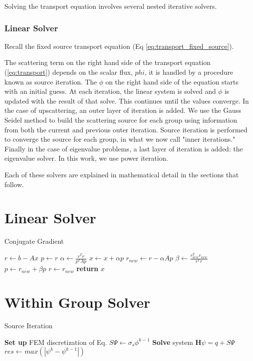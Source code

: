 
Solving the transport equation involves several nested iterative solvers. 
\subsubsection{Linear Solver}
Recall the fixed source transport equation (Eq \ref{eq:transport_fixed_source}).   




The scattering term on the right hand side of the transport equation (\ref{eq:transport}) depends on the scalar flux, $phi$, it is handled by a procedure known as source iteration. The $\phi$ on the right hand side of the equation starts with an initial guess. At each iteration, the linear system is solved and $\phi$ is updated with the result of that solve. This continues until the values converge. In the case of upscattering, an outer layer of iteration is added. We use the Gauss Seidel method to build the scattering source for each group using information from both the current and previous outer iteration. Source iteration is performed to converge the source for each group, in what we now call "inner iterations." Finally in the case of eigenvalue problems, a last layer of iteration is added: the eigenvalue solver. In this work, we use power iteration.
\par
Each of these solvers are explained in mathematical detail in the sections that follow.
\section{Linear Solver}
\begin{algorithm}
\caption{Conjugate Gradient}
\begin{algorithmic}
    \State $r \gets b - Ax$
    \State $p \gets r$
        \State $\alpha \gets \frac{r^Tr}{p^TAp}$
        \State $x \gets x + \alpha p$
        \State $r_{new} \gets r - \alpha A p$
        \State $\beta \gets \frac{r_{new}^Tr_{new}}{r^Tr}$
        \State $p \gets r_{new} + \beta p$
        \State $r \gets r_{new}$
    \EndWhile
    \State \textbf{return} $x$  
\end{algorithmic}
\end{algorithm}

\section{Within Group Solver}
\begin{algorithm}
\caption{Source Iteration}
\begin{algorithmic}
 
    \State \textbf{Set up} FEM discretization of Eq.
    \State $S\Psi \gets \sigma_s \phi^{k-1}$ 
    \State \textbf{Solve} system $\textbf{H}\psi=q + S\Psi$
    \State $res \gets max(|\psi^{k} - \psi^{k-1}|)$
\EndWhile
\end{algorithmic}
\end{algorithm}

